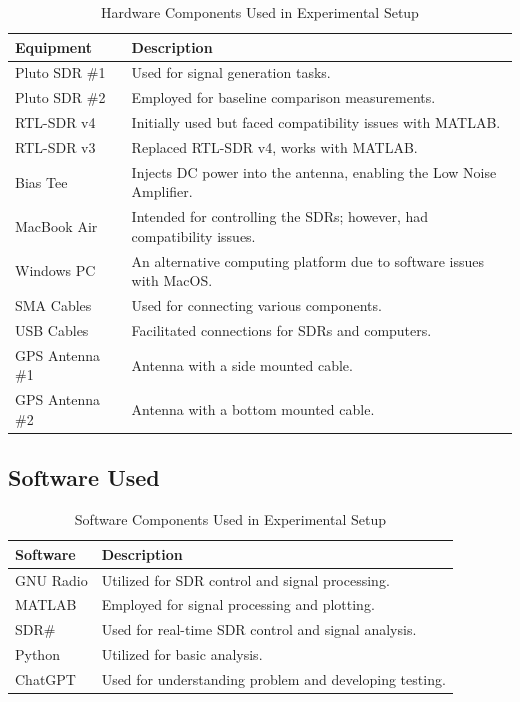 \documentclass[12pt,letter]{article}
\begin{document}
\begin{table}[h!]
    \centering
    \begin{tabular}{ll}
        \toprule
        \textbf{Equipment} & \textbf{Description} \\
        \midrule
        Pluto SDR \#1 & Used for signal generation tasks. \\
        Pluto SDR \#2 & Employed for baseline comparison measurements. \\
        RTL-SDR v4 & Initially used but faced compatibility issues with MATLAB. \\
        RTL-SDR v3 & Replaced RTL-SDR v4, works with MATLAB. \\
        Bias Tee & Injects DC power into the antenna, enabling the Low Noise Amplifier. \\
        MacBook Air & Intended for controlling the SDRs; however, had compatibility issues. \\
        Windows PC & An alternative computing platform due to software issues with MacOS. \\
        SMA Cables & Used for connecting various components. \\
        USB Cables & Facilitated connections for SDRs and computers. \\
        GPS Antenna \#1 & Antenna with a side mounted cable. \\
        GPS Antenna \#2 & Antenna with a bottom mounted cable. \\
        \bottomrule
    \end{tabular}
    \caption{Hardware Components Used in Experimental Setup}
    \label{tab:equipment_used}
\end{table}


\subsection*{Software Used}

\begin{table}[h!]
    \centering
    \begin{tabular}{ll}
        \toprule
        \textbf{Software} & \textbf{Description} \\
        \midrule
        GNU Radio & Utilized for SDR control and signal processing. \\
        MATLAB & Employed for signal processing and plotting. \\
        SDR\# & Used for real-time SDR control and signal analysis. \\
        Python & Utilized for basic analysis. \\
        ChatGPT & Used for understanding problem and developing testing. \\
        \bottomrule
    \end{tabular}
    \caption{Software Components Used in Experimental Setup}
    \label{tab:software_used}
\end{table}
\end{document}
